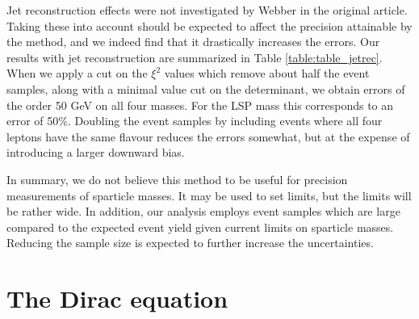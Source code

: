 \documentclass[twoside,english]{uiofysmaster}
\begin{document}
Jet reconstruction effects were not investigated by Webber in the original article. Taking these into account should be expected to affect the precision attainable by the method, and we indeed find that it drastically increases the errors. Our results with jet reconstruction are summarized in Table \ref{table:table_jetrec}. When we apply a cut on the $\xi^2$ values which remove about half the event samples, along with a minimal value cut on the determinant, we obtain errors of the order 50 GeV on all four masses. For the LSP mass this corresponds to an error of 50\%. Doubling the event samples by including events where all four leptons have the same flavour reduces the errors somewhat, but at the expense of introducing a larger downward bias. 

In summary, we do not believe this method to be useful for precision measurements of sparticle masses. It may be used to set limits, but the limits will be rather wide. In addition, our analysis employs event samples which are large compared to the expected event yield given current limits on sparticle masses. Reducing the sample size is expected to further increase the uncertainties. 









































\appendix




\chapter{The Dirac equation}
\label{appendix:diraceq}
\end{document}
